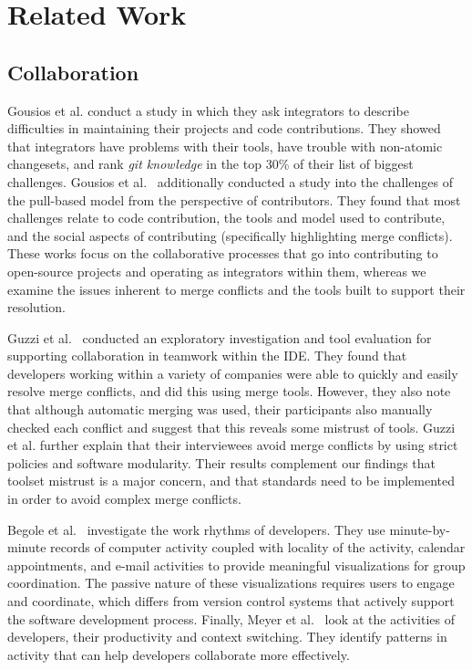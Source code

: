 
\section{Related Work}\label{related_work}

\subsection{Collaboration}

Gousios et al. \cite{integrator_perspective} conduct a study in which they ask integrators to describe difficulties in maintaining their projects and code contributions. 
They showed that integrators have problems with their tools, have trouble with non-atomic changesets, and rank \textit{git knowledge} in the top 30\% of their list of biggest challenges. 
Gousios et al.~\cite{gousios2016work} additionally conducted a study into the challenges of the pull-based model from the perspective of contributors. 
They found that most challenges relate to code contribution, the tools and model used to contribute, and the social aspects of contributing (specifically highlighting merge conflicts).
These works focus on the collaborative processes that go into contributing to open-source projects and operating as integrators within them, whereas we examine the issues inherent to merge conflicts and the tools built to support their resolution.

Guzzi et al.~\cite{Guzzi2015} conducted an exploratory investigation and tool evaluation for supporting collaboration in teamwork within the IDE.
They found that developers working within a variety of companies were able to quickly and easily resolve merge conflicts, and did this using merge tools.
However, they also note that although automatic merging was used, their participants also manually checked each conflict and suggest that this reveals some mistrust of tools.
Guzzi et al. further explain that their interviewees avoid merge conflicts by using strict policies and software modularity.
Their results complement our findings that toolset mistrust is a major concern, and that standards need to be implemented in order to avoid complex merge conflicts.

Begole et al.~\cite{begole_work_2002} investigate the work rhythms of developers.
They use minute-by-minute records of computer activity coupled with locality of the activity, calendar appointments, and e-mail activities to provide meaningful visualizations for group coordination.
The passive nature of these visualizations requires users to engage and coordinate, which differs from version control systems that actively support the software development process.
Finally, Meyer et al.~\cite{meyer_work_2017} look at the activities of developers, their productivity and context switching.
They identify patterns in activity that can help developers collaborate more effectively. 

